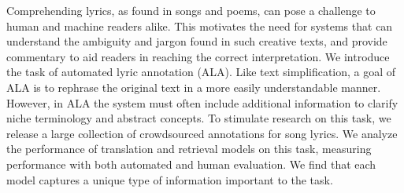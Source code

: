 Comprehending lyrics, as found in songs and poems, can pose a challenge to human and machine readers alike.  This motivates the need for systems that can understand the ambiguity and jargon found in such creative texts, and provide commentary to aid readers in reaching the correct interpretation. We introduce the task of automated lyric annotation (ALA).  Like text simplification, a goal of ALA is to rephrase the original text in a more easily understandable manner. However, in ALA the system must often include additional information to clarify niche terminology and abstract concepts. To stimulate research on this task, we release a large collection of crowdsourced annotations for song lyrics. We analyze the performance of translation and retrieval models on this task, measuring performance with both automated and human evaluation. We find that each model captures a unique type of information important to the task.
